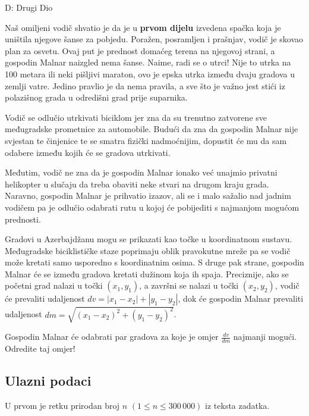 \begin{statement}[
  timelimit=1 s,
  memorylimit=512 MiB,
]{D: Drugi Dio}

Naš omiljeni vodič shvatio je da je u \textbf{prvom dijelu} izvedena spačka
koja je uništila njegove šanse za pobjedu. Poražen, posramljen i prašnjav,
vodič je skovao plan za osvetu. Ovaj put je prednost domaćeg terena na njegovoj
strani, a gospodin Malnar naizgled nema šanse. Naime, radi se o utrci!
Nije to utrka na 100 metara ili neki pišljivi maraton, ovo je epska utrka
između dvaju gradova u zemlji vatre. Jedino pravlio je da nema pravila, a sve
što je važno jest stići iz polazišnog grada u odredišni grad prije suparnika.

Vodič se odlučio utrkivati biciklom jer zna da su trenutno zatvorene sve
međugradske prometnice za automobile. Budući da zna da gospodin Malnar nije
svjestan te činjenice te se smatra fizički nadmoćnijim, dopustit će mu da sam
odabere između kojih će se gradova utrkivati.

Međutim, vodič ne zna da je gospodin Malnar ionako već unajmio privatni
helikopter u slučaju da treba obaviti neke stvari na drugom kraju grada.
Naravno, gospodin Malnar je prihvatio izazov, ali se i malo sažalio nad
jadnim vodičem pa je odlučio odabrati rutu u kojoj će pobijediti s najmanjom
mogućom prednosti.

Gradovi u Azerbajdžanu mogu se prikazati kao točke u koordinatnom sustavu.
Međugradske biciklističke staze poprimaju oblik pravokutne mreže pa se vodič
može kretati samo usporedno s koordinatnim osima. S druge pak strane,
gospodin Malnar će se između gradova kretati dužinom koja ih spaja.
Preciznije, ako se početni grad nalazi u točki $(x_1, y_1)$, a završni se
nalazi u točki $(x_2, y_2)$, vodič će prevaliti udaljenost $dv = |x_1 - x_2|
+ |y_1 - y_2|$, dok će gospodin Malnar prevaliti udaljenost $dm =
\sqrt{(x_1-x_2)^2 + (y_1-y_2)^2}$.

Gospodin Malnar će odabrati par gradova za koje je omjer $\frac{dv}{dm}$
najmanji mogući. Odredite taj omjer!

\subsection*{Ulazni podaci}
U prvom je retku prirodan broj $n$ $(1 \le n \le 300\,000)$ iz teksta
zadatka.


\end{statement}
